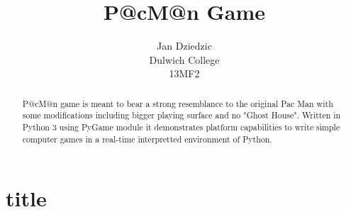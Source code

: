 \documentclass[]{report}
\title{P@cM@n Game}
\author{Jan Dziedzic\\
		Dulwich College\\
		13MF2}
\begin{document}
\maketitle

\begin{abstract}
	P@cM@n game is meant to bear a strong resemblance to the original Pac Man with some modifications including bigger playing surface and no "Ghost House". Written in Python 3 using PyGame module it demonstrates platform capabilities to write simple computer games in a real-time interpretted environment of Python. 
\end{abstract}
\section{title}
\end{document}
